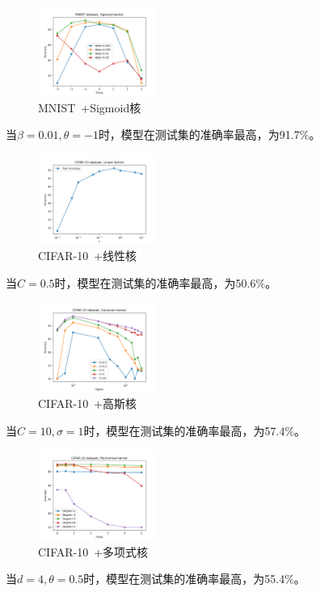\documentclass[a4paper]{article}
\begin{document}
\begin{figure}[H]
    \centering
    \includegraphics[width=0.35\textwidth]{pictures/single kernel/参数消融+MNIST+sigmoid核.png}
    \caption{MNIST\ +Sigmoid核}
\end{figure}
当$\beta=0.01, \theta=-1$时，模型在测试集的准确率最高，为91.7\%。

\begin{figure}[H]
    \centering
    \includegraphics[width=0.35\textwidth]{pictures/single kernel/参数消融+CIFAR10+线性核.png}
    \caption{CIFAR-10\ +线性核}
\end{figure}
当$C=0.5$时，模型在测试集的准确率最高，为50.6\%。

\begin{figure}[H]
    \centering
    \includegraphics[width=0.35\textwidth]{pictures/single kernel/参数消融+CIFAR10+高斯核.png}
    \caption{CIFAR-10\ +高斯核}
\end{figure}
当$C=10, \sigma=1$时，模型在测试集的准确率最高，为57.4\%。

\begin{figure}[H]
    \centering
    \includegraphics[width=0.35\textwidth]{pictures/single kernel/参数消融+CIFAR10+多项式核.png}
    \caption{CIFAR-10\ +多项式核}
\end{figure}
当$d=4, \theta=0.5$时，模型在测试集的准确率最高，为55.4\%。
\end{document}

